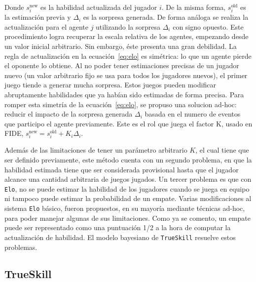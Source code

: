 \documentclass[11pt,twoside,spanish]{report} %
\begin{document}
Donde $s_i^{\text{new}}$ es la habilidad actualizada del jugador $i$.
De la misma forma,  $s_i^{\text{old}}$ es la estimaci\'on previa y  $\Delta_i$ es la sorpresa generada.
De forma an\'aloga se realiza la actualizaci\'on para el agente $j$ utilizando la sorpresa $\Delta_i$ con signo opuesto.
Este procedimiento logra recuperar la escala relativa de los agentes, empezando desde un valor inicial arbitrario.
Sin embargo, \'este presenta una gran debilidad.
La regla de actualizaci\'on en la ecuaci\'on~\ref{eq:elo} es sim\'etrica: lo que un agente pierde el oponente lo obtiene.
Al no poder tener estimaciones precisas de un jugador nuevo (un valor arbitrario fijo se usa para todos los jugadores nuevos), el primer juego tiende a generar mucha sorpresa.
Estos juegos pueden modificar abruptamente habilidades que ya hab\'ian sido estimadas de forma precisa.
Para romper esta simetr\'ia de la ecuaci\'on~\ref{eq:elo}, se propuso una solucion ad-hoc: reducir el impacto de la sorpresa generada $\Delta_i$ basada en el numero de eventos que participo el agente previamente.
Este es el rol que juega el factor K, usado en FIDE, $s_i^{\text{new}} = s_i^{\text{old}} + K_i\Delta_i$.


Adem\'as de las limitaciones de tener un par\'ametro arbitrario $K$, el cual tiene que ser definido previamente, este m\'etodo cuenta con un segundo problema, en que la habilidad estimada tiene que ser considerada provisional hasta que el jugador alcance una cantidad arbitraria de juegos jugados.
Un tercer problema es que con \texttt{Elo}, no se puede estimar la habilidad de los jugadores cuando se juega en equipo ni tampoco puede estimar la probabilidad de un empate.
Varias modificaciones al sistema \texttt{Elo} b\'asico, fueron propuestos, en su mayor\'ia mediante t\'ecnicas ad-hoc, para poder manejar algunas de sus limitaciones.
Como ya se comento, un empate puede ser representado como una puntuaci\'on 1/2 a la hora de computar la actualizaci\'on de habilidad.
El modelo bayesiano de \texttt{TrueSkill} resuelve estos problemas.




\subsection{TrueSkill}
\end{document}

